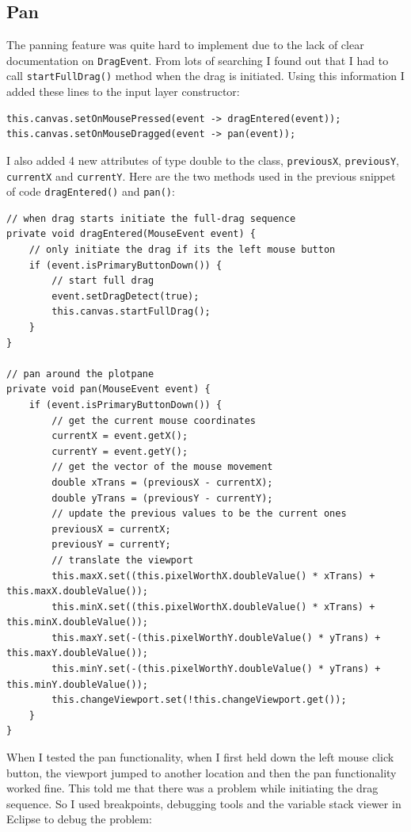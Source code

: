 \documentclass[../../../../main.tex]{subfiles}
\begin{document}
\subsection{Pan}
The panning feature was quite hard to implement due to the lack of clear documentation on \texttt{DragEvent}. From lots of searching I found out that I had to call \texttt{startFullDrag()} method when the drag is initiated. Using this information I added these lines to the input layer constructor:
\begin{verbatim}
this.canvas.setOnMousePressed(event -> dragEntered(event));
this.canvas.setOnMouseDragged(event -> pan(event));
\end{verbatim}
I also added 4 new attributes of type double to the class, \texttt{previousX}, \texttt{previousY}, \texttt{currentX} and \texttt{currentY}. Here are the two methods used in the previous snippet of code \texttt{dragEntered()} and \texttt{pan()}:
\begin{verbatim}
// when drag starts initiate the full-drag sequence
private void dragEntered(MouseEvent event) {
	// only initiate the drag if its the left mouse button
	if (event.isPrimaryButtonDown()) {
		// start full drag
		event.setDragDetect(true);
		this.canvas.startFullDrag();
	}
}

// pan around the plotpane
private void pan(MouseEvent event) {
	if (event.isPrimaryButtonDown()) {
		// get the current mouse coordinates
		currentX = event.getX();
		currentY = event.getY();
		// get the vector of the mouse movement
		double xTrans = (previousX - currentX);
		double yTrans = (previousY - currentY);
		// update the previous values to be the current ones
		previousX = currentX;
		previousY = currentY;
		// translate the viewport
		this.maxX.set((this.pixelWorthX.doubleValue() * xTrans) + this.maxX.doubleValue());
		this.minX.set((this.pixelWorthX.doubleValue() * xTrans) + this.minX.doubleValue());
		this.maxY.set(-(this.pixelWorthY.doubleValue() * yTrans) + this.maxY.doubleValue());
		this.minY.set(-(this.pixelWorthY.doubleValue() * yTrans) + this.minY.doubleValue());
		this.changeViewport.set(!this.changeViewport.get());
	}
}
\end{verbatim}
\newpage
When I tested the pan functionality, when I first held down the left mouse click button, the viewport jumped to another location and then the pan functionality worked fine. This told me that there was a problem while initiating the drag sequence. So I used breakpoints, debugging tools and the variable stack viewer in Eclipse to debug the problem:
\end{document}
